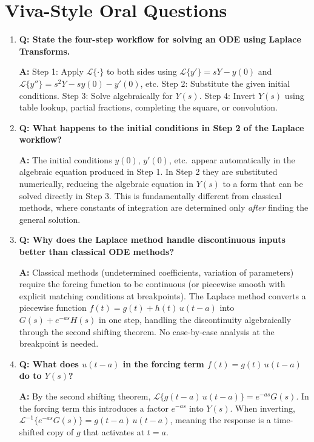 \documentclass[12pt,a4paper]{article}
\begin{document}
\section{Viva-Style Oral Questions}

\begin{enumerate}

\item \textbf{Q: State the four-step workflow for solving an ODE using Laplace Transforms.}

\textbf{A:} Step 1: Apply $\mathcal{L}\{\cdot\}$ to both sides using
$\mathcal{L}\{y'\}=sY-y(0)$ and $\mathcal{L}\{y''\}=s^2Y-sy(0)-y'(0)$, etc.
Step 2: Substitute the given initial conditions. Step 3: Solve algebraically for
$Y(s)$. Step 4: Invert $Y(s)$ using table lookup, partial fractions, completing
the square, or convolution.

\item \textbf{Q: What happens to the initial conditions in Step 2 of the Laplace workflow?}

\textbf{A:} The initial conditions $y(0)$, $y'(0)$, etc.\ appear automatically in the
algebraic equation produced in Step 1. In Step 2 they are substituted numerically,
reducing the algebraic equation in $Y(s)$ to a form that can be solved directly in
Step 3. This is fundamentally different from classical methods, where constants of
integration are determined only \emph{after} finding the general solution.

\item \textbf{Q: Why does the Laplace method handle discontinuous inputs better than classical ODE methods?}

\textbf{A:} Classical methods (undetermined coefficients, variation of parameters)
require the forcing function to be continuous (or piecewise smooth with explicit
matching conditions at breakpoints). The Laplace method converts a piecewise function
$f(t) = g(t) + h(t)\,u(t-a)$ into $G(s) + e^{-as}H(s)$ in one step, handling the
discontinuity algebraically through the second shifting theorem. No case-by-case
analysis at the breakpoint is needed.

\item \textbf{Q: What does $u(t-a)$ in the forcing term $f(t) = g(t)\,u(t-a)$ do to $Y(s)$?}

\textbf{A:} By the second shifting theorem,
$\mathcal{L}\{g(t-a)\,u(t-a)\} = e^{-as}G(s)$.
In the forcing term this introduces a factor $e^{-as}$ into $Y(s)$. When inverting,
$\mathcal{L}^{-1}\{e^{-as}G(s)\} = g(t-a)\,u(t-a)$, meaning the response is a
time-shifted copy of $g$ that activates at $t=a$.


\end{enumerate}
\end{document}
